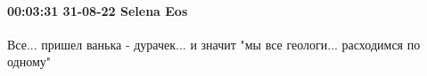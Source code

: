  
 
 
 
 

\paragraph{00:03:31 31-08-22 Selena Eos}

Все... пришел ванька - дурачек... и значит "мы все геологи... расходимся по
одному"
